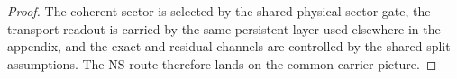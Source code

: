 \begin{proof}
The coherent sector is selected by the shared physical-sector gate, the transport readout is carried by the same persistent layer used elsewhere in the appendix, and the exact and residual channels are controlled by the shared split assumptions.
The NS route therefore lands on the common carrier picture.
\end{proof}
